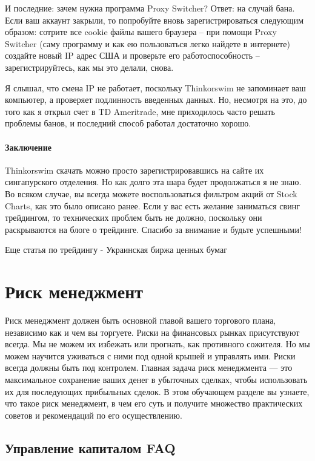 \documentclass[a5paper]{article}
\begin{document}
И последние: зачем нужна программа Proxy Switcher? Ответ: на случай бана. Если ваш аккаунт закрыли, то попробуйте вновь зарегистрироваться следующим образом: сотрите все cookie файлы вашего браузера – при помощи Proxy Switcher (саму программу и как ею пользоваться легко найдете в интернете) создайте новый IP адрес США и проверьте его работоспособность – зарегистрируйтесь, как мы это делали, снова.

Я слышал, что смена IP не работает, поскольку Thinkorswim не
запоминает ваш компьютер, а проверяет подлинность введенных
данных. Но, несмотря на это, до того как я открыл счет в TD
Ameritrade, мне приходилось часто решать проблемы банов, и последний
способ работал достаточно хорошо.

\paragraph{Заключение}

Thinkorswim скачать можно просто зарегистрировавшись на сайте их сингапурского отделения. Но как долго эта шара будет продолжаться я не знаю. Во всяком случае, вы всегда можете воспользоваться фильтром акций от Stock Charts, как это было описано ранее. Если у вас есть желание заниматься свинг трейдингом, то технических проблем быть не должно, поскольку они раскрываются на блоге о трейдинге. Спасибо за внимание и будьте успешными!


Еще статья по трейдингу - Украинская биржа ценных бумаг


\section{Риск менеджмент}

Риск менеджмент должен быть основной главой вашего торгового плана,
независимо как и чем вы торгуете. Риски на финансовых рынках
присутствуют всегда. Мы не можем их избежать или прогнать, как
противного сожителя. Но мы можем научится уживаться с ними под одной
крышей и управлять ими. Риски всегда должны быть под
контролем. Главная задача риск менеджмента — это максимальное
сохранение ваших денег в убыточных сделках, чтобы использовать их для
последующих прибыльных сделок. В этом обучающем разделе вы узнаете,
что такое риск менеджмент, в чем его суть и получите множество
практических советов и рекомендаций по его осуществлению.

\subsection{Управление капиталом FAQ}
\end{document}
